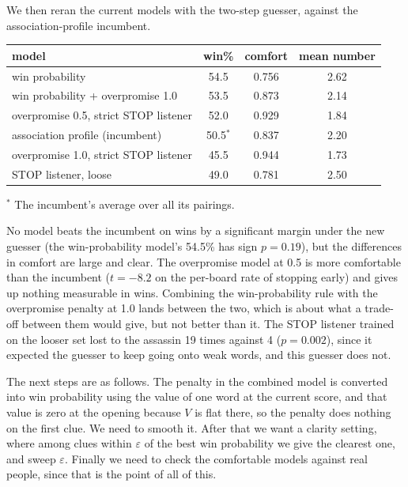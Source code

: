 \documentclass[11pt]{article}
\begin{document}
We then reran the current models with the two-step guesser, against the
association-profile incumbent.

\begin{center}
\small
\begin{tabular}{lccc}
\toprule
model & win\% & comfort & mean number \\
\midrule
win probability & 54.5 & 0.756 & 2.62 \\
win probability + overpromise 1.0 & 53.5 & 0.873 & 2.14 \\
overpromise 0.5, strict STOP listener & 52.0 & 0.929 & 1.84 \\
association profile (incumbent) & 50.5$^*$ & 0.837 & 2.20 \\
overpromise 1.0, strict STOP listener & 45.5 & 0.944 & 1.73 \\
STOP listener, loose & 49.0 & 0.781 & 2.50 \\
\bottomrule
\end{tabular}
\end{center}
{\small $^*$ The incumbent's average over all its pairings.}

No model beats the incumbent on wins by a significant margin under the new
guesser (the win-probability model's 54.5\% has sign $p = 0.19$), but the
differences in comfort are large and clear. The overpromise model at 0.5 is more
comfortable than the incumbent ($t = -8.2$ on the per-board rate of stopping
early) and gives up nothing measurable in wins. Combining the win-probability
rule with the overpromise penalty at 1.0 lands between the two, which is about
what a trade-off between them would give, but not better than it. The STOP
listener trained on the looser set lost to the assassin 19 times against 4 ($p =
0.002$), since it expected the guesser to keep going onto weak words, and this
guesser does not.

The next steps are as follows. The penalty in the combined model is converted into
win probability using the value of one word at the current score, and that value is
zero at the opening because $V$ is flat there, so the penalty does nothing on the
first clue. We need to smooth it. After that we want a clarity setting, where among
clues within $\varepsilon$ of the best win probability we give the clearest one, and
sweep $\varepsilon$. Finally we need to check the comfortable models against real
people, since that is the point of all of this.
\end{document}
